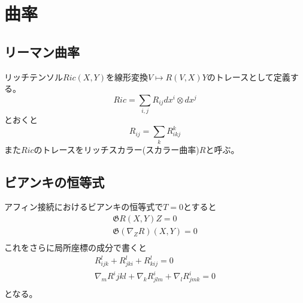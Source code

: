 \section{曲率}
    \subsection{リーマン曲率}
        リッチテンソル$Ric(X, Y)$を線形変換$V \mapsto R(V, X)Y$のトレースとして定義する。
            \[Ric = \sum_{i,j} R_{ij}dx^i \otimes dx^j\]
        とおくと
            \[R_{ij} = \sum_k R^k_{ikj}\]
        また$Ric$のトレースをリッチスカラー(スカラー曲率)$R$と呼ぶ。


    \subsection{ビアンキの恒等式}
        アフィン接続におけるビアンキの恒等式で$T = 0$とすると
        \begin{gather*}
            \mathfrak{G}{R(X, Y)Z} = 0\\
            \mathfrak{G}{(\nabla_ZR)(X, Y)} = 0\\
        \end{gather*}
        これをさらに局所座標の成分で書くと
        \begin{gather*}
            R^l_{ijk} + R^l_{jki} + R^l_{kij} = 0\\
            \nabla_mR^i{jkl} + \nabla_kR^i_{jlm} + \nabla_lR^i_{jmk} = 0\\
        \end{gather*}
        となる。

